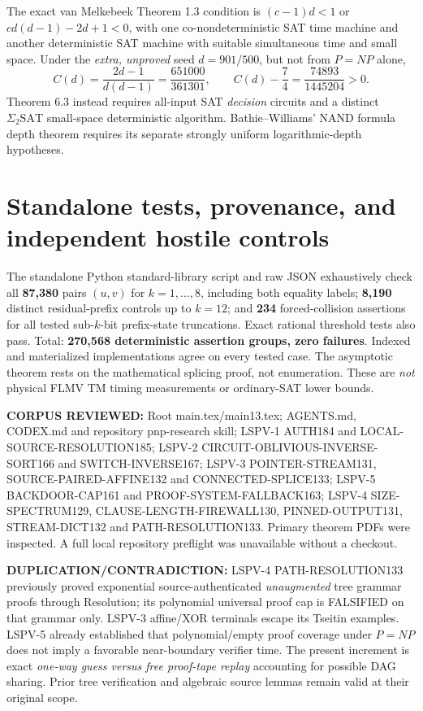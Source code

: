 \documentclass[11pt]{article}
\begin{document}
The exact van Melkebeek Theorem 1.3 condition is $(c-1)d<1$ or $cd(d-1)-2d+1<0$, with one co-nondeterministic SAT time machine and another deterministic SAT machine with suitable simultaneous time and small space. Under the \emph{extra, unproved} seed $d=901/500$, but not from $P=NP$ alone,
\[
 C(d)=\frac{2d-1}{d(d-1)}=\frac{651000}{361301},\qquad
 C(d)-\frac74=\frac{74893}{1445204}>0.\tag{5}
\]
Theorem 6.3 instead requires all-input SAT \emph{decision} circuits and a distinct $\Sigma_2\mathrm{SAT}$ small-space deterministic algorithm. Bathie--Williams' NAND formula depth theorem requires its separate strongly uniform logarithmic-depth hypotheses.

\section{Standalone tests, provenance, and independent hostile controls}
The standalone Python standard-library script
and raw JSON exhaustively check all \textbf{87,380} pairs $(u,v)$ for $k=1,\dots,8$, including both equality labels; \textbf{8,190} distinct residual-prefix controls up to $k=12$; and \textbf{234} forced-collision assertions for all tested sub-$k$-bit prefix-state truncations. Exact rational threshold tests also pass. Total: \textbf{270,568 deterministic assertion groups, zero failures}. Indexed and materialized implementations agree on every tested case. The asymptotic theorem rests on the mathematical splicing proof, not enumeration. These are \emph{not} physical FLMV TM timing measurements or ordinary-SAT lower bounds.

\noindent\textbf{CORPUS REVIEWED:} Root main.tex/main13.tex; AGENTS.md, CODEX.md and repository pnp-research skill; LSPV-1 AUTH184 and LOCAL-SOURCE-RESOLUTION185; LSPV-2 CIRCUIT-OBLIVIOUS-INVERSE-SORT166 and SWITCH-INVERSE167; LSPV-3 POINTER-STREAM131, SOURCE-PAIRED-AFFINE132 and CONNECTED-SPLICE133; LSPV-5 BACKDOOR-CAP161 and PROOF-SYSTEM-FALLBACK163; LSPV-4 SIZE-SPECTRUM129, CLAUSE-LENGTH-FIREWALL130, PINNED-OUTPUT131, STREAM-DICT132 and PATH-RESOLUTION133. Primary theorem PDFs were inspected. A full local repository preflight was unavailable without a checkout.

\noindent\textbf{DUPLICATION/CONTRADICTION:} LSPV-4 PATH-RESOLUTION133 previously proved exponential source-authenticated \emph{unaugmented} tree grammar proofs through Resolution; its polynomial universal proof cap is FALSIFIED on that grammar only. LSPV-3 affine/XOR terminals escape its Tseitin examples. LSPV-5 already established that polynomial/empty proof coverage under $P=NP$ does not imply a favorable near-boundary verifier time. The present increment is exact \emph{one-way guess versus free proof-tape replay} accounting for possible DAG sharing. Prior tree verification and algebraic source lemmas remain valid at their original scope.
\end{document}
